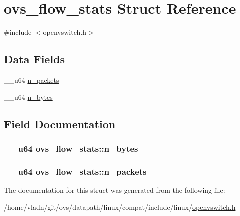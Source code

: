 \hypertarget{structovs__flow__stats}{}\section{ovs\+\_\+flow\+\_\+stats Struct Reference}
\label{structovs__flow__stats}


{\ttfamily \#include $<$openvswitch.\+h$>$}

\subsection*{Data Fields}
\begin{DoxyCompactItemize}
\item 
\+\_\+\+\_\+u64 \hyperlink{structovs__flow__stats_ab82070e9f656011c1a5b988082c7bfcc}{n\+\_\+packets}
\item 
\+\_\+\+\_\+u64 \hyperlink{structovs__flow__stats_a4dea1785485d954f41121a561701ddf2}{n\+\_\+bytes}
\end{DoxyCompactItemize}


\subsection{Field Documentation}
\hypertarget{structovs__flow__stats_a4dea1785485d954f41121a561701ddf2}{}
\subsubsection[{n\+\_\+bytes}]{\setlength{\rightskip}{0pt plus 5cm}\+\_\+\+\_\+u64 ovs\+\_\+flow\+\_\+stats\+::n\+\_\+bytes}\label{structovs__flow__stats_a4dea1785485d954f41121a561701ddf2}
\hypertarget{structovs__flow__stats_ab82070e9f656011c1a5b988082c7bfcc}{}
\subsubsection[{n\+\_\+packets}]{\setlength{\rightskip}{0pt plus 5cm}\+\_\+\+\_\+u64 ovs\+\_\+flow\+\_\+stats\+::n\+\_\+packets}\label{structovs__flow__stats_ab82070e9f656011c1a5b988082c7bfcc}


The documentation for this struct was generated from the following file\+:\begin{DoxyCompactItemize}
\item 
/home/vladn/git/ovs/datapath/linux/compat/include/linux/\hyperlink{openvswitch_8h}{openvswitch.\+h}\end{DoxyCompactItemize}
